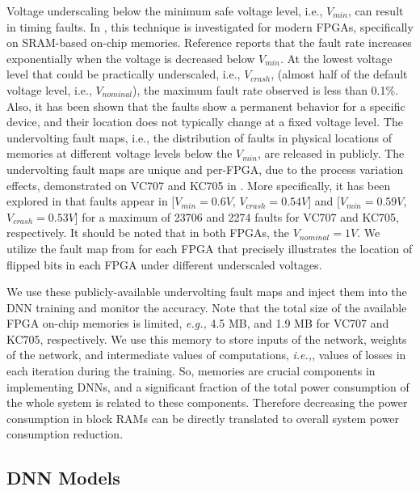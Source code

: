 \documentclass[conference]{IEEEtran}
\begin{document}
Voltage underscaling below the minimum safe voltage level, i.e., $V_{min}$, can result in timing faults. In \cite{salami2018comprehensive}, this technique is investigated for modern FPGAs, specifically on SRAM-based on-chip memories. Reference \cite{salami2018comprehensive} reports that the fault rate increases exponentially when the voltage is decreased below $V_{min}$. At the lowest voltage level that could be practically underscaled, i.e., $V_{crash}$, (almost half of the default voltage level, i.e., $V_{nominal}$), the maximum fault rate observed is less than 0.1\%. Also, it has been shown that the faults show a permanent behavior for a specific device, and their location does not typically change at a fixed voltage level. The undervolting fault maps, i.e., the distribution of faults in physical locations of memories at different voltage levels below the $V_{min}$, are released in \cite{fault-map} publicly. The undervolting fault maps are unique and per-FPGA, due to the process variation effects, demonstrated on VC707 and KC705 in \cite{salami2018comprehensive}. More specifically, it has been explored in \cite{salami2018comprehensive} that faults appear in [$V_{min}=0.6V$, $V_{crash}=0.54V$] and [$V_{min}=0.59V$, $V_{crash}=0.53V$] for a maximum of 23706 and 2274 faults for VC707 and KC705, respectively. It should be noted that in both FPGAs, the $V_{nominal}=1V$. We utilize the fault map from \cite{fault-map} for each FPGA that precisely illustrates the location of flipped bits in each FPGA under different underscaled voltages.

We use these publicly-available undervolting fault maps and inject them into the DNN training and monitor the accuracy. Note that the total size of the available FPGA on-chip memories is limited, \textit{e.g.,} 4.5 MB, and 1.9 MB for VC707 and KC705, respectively. We use this memory to store inputs of the network, weights of the network, and intermediate values of computations, \textit{i.e.,}, values of losses in each iteration during the training. So, memories are crucial components in implementing DNNs, and a significant fraction of the total power consumption of the whole system is related to these components. Therefore decreasing the power consumption in block RAMs can be directly translated to overall system power consumption reduction.



\subsection{DNN Models}
\end{document}
